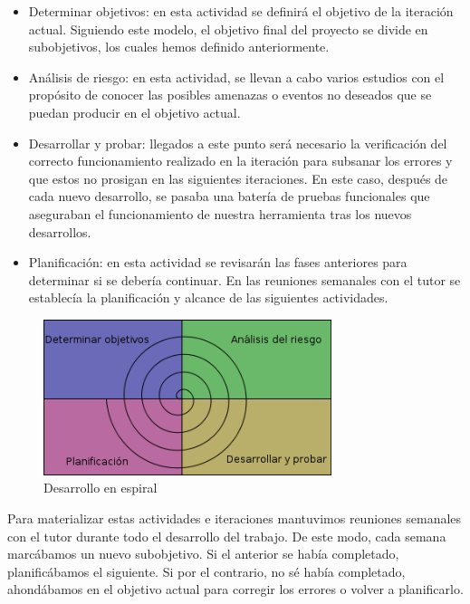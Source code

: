 \begin{itemize}
\item Determinar objetivos: en esta actividad se definirá el objetivo de la iteración actual. Siguiendo este modelo, el objetivo final del proyecto se divide en subobjetivos, los cuales hemos definido anteriormente.
\item Análisis de riesgo: en esta actividad, se llevan a cabo varios estudios con el propósito de conocer las posibles amenazas o eventos no deseados que se puedan producir en el objetivo actual.
\item Desarrollar y probar: llegados a este punto será necesario la verificación del correcto funcionamiento realizado en la iteración para subsanar los errores y que estos no prosigan en las siguientes iteraciones. En este caso, después de cada nuevo desarrollo, se pasaba una batería de pruebas funcionales que aseguraban el funcionamiento de nuestra herramienta tras los nuevos desarrollos.
\item Planificación: en esta actividad se revisarán las fases anteriores para determinar si se debería continuar. En las reuniones semanales con el tutor se establecía la planificación y alcance de las siguientes actividades.
\end{itemize}

\begin{figure}[h]
    \centering
    \includegraphics[width=0.75\textwidth]{img/metodologia_espiral}
    \caption{Desarrollo en espiral}
    \label{fig:espira}
\end{figure}

Para materializar estas actividades e iteraciones mantuvimos reuniones semanales con el tutor durante todo el desarrollo del trabajo. De este modo, cada semana marcábamos un nuevo subobjetivo. Si el anterior se había completado, planificábamos el siguiente. Si por el contrario, no sé había completado, ahondábamos en el objetivo actual para corregir los errores o volver a planificarlo.\\

